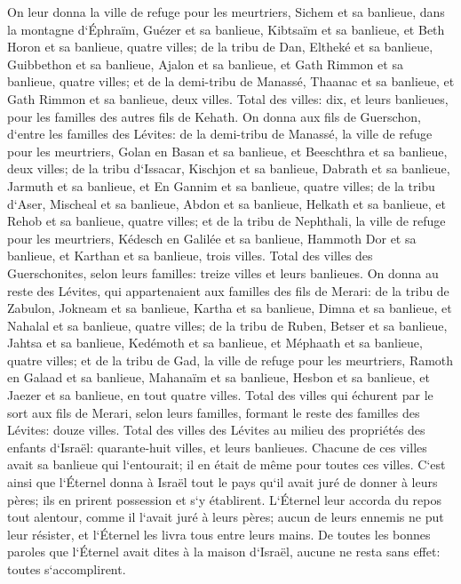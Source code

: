\verse On leur donna la ville de refuge pour les meurtriers, Sichem et sa banlieue, dans la montagne d`Éphraïm, Guézer et sa banlieue, 
\verse Kibtsaïm et sa banlieue, et Beth Horon et sa banlieue, quatre villes; 
\verse de la tribu de Dan, Eltheké et sa banlieue, Guibbethon et sa banlieue, 
\verse Ajalon et sa banlieue, et Gath Rimmon et sa banlieue, quatre villes; 
\verse et de la demi-tribu de Manassé, Thaanac et sa banlieue, et Gath Rimmon et sa banlieue, deux villes. 
\verse Total des villes: dix, et leurs banlieues, pour les familles des autres fils de Kehath. 
\verse On donna aux fils de Guerschon, d`entre les familles des Lévites: de la demi-tribu de Manassé, la ville de refuge pour les meurtriers, Golan en Basan et sa banlieue, et Beeschthra et sa banlieue, deux villes; 
\verse de la tribu d`Issacar, Kischjon et sa banlieue, Dabrath et sa banlieue, 
\verse Jarmuth et sa banlieue, et En Gannim et sa banlieue, quatre villes; 
\verse de la tribu d`Aser, Mischeal et sa banlieue, Abdon et sa banlieue, 
\verse Helkath et sa banlieue, et Rehob et sa banlieue, quatre villes; 
\verse et de la tribu de Nephthali, la ville de refuge pour les meurtriers, Kédesch en Galilée et sa banlieue, Hammoth Dor et sa banlieue, et Karthan et sa banlieue, trois villes. 
\verse Total des villes des Guerschonites, selon leurs familles: treize villes et leurs banlieues. 
\verse On donna au reste des Lévites, qui appartenaient aux familles des fils de Merari: de la tribu de Zabulon, Jokneam et sa banlieue, Kartha et sa banlieue, 
\verse Dimna et sa banlieue, et Nahalal et sa banlieue, quatre villes; 
\verse de la tribu de Ruben, Betser et sa banlieue, Jahtsa et sa banlieue, 
\verse Kedémoth et sa banlieue, et Méphaath et sa banlieue, quatre villes; 
\verse et de la tribu de Gad, la ville de refuge pour les meurtriers, Ramoth en Galaad et sa banlieue, Mahanaïm et sa banlieue, 
\verse Hesbon et sa banlieue, et Jaezer et sa banlieue, en tout quatre villes. 
\verse Total des villes qui échurent par le sort aux fils de Merari, selon leurs familles, formant le reste des familles des Lévites: douze villes. 
\verse Total des villes des Lévites au milieu des propriétés des enfants d`Israël: quarante-huit villes, et leurs banlieues. 
\verse Chacune de ces villes avait sa banlieue qui l`entourait; il en était de même pour toutes ces villes. 
\verse C`est ainsi que l`Éternel donna à Israël tout le pays qu`il avait juré de donner à leurs pères; ils en prirent possession et s`y établirent. 
\verse L`Éternel leur accorda du repos tout alentour, comme il l`avait juré à leurs pères; aucun de leurs ennemis ne put leur résister, et l`Éternel les livra tous entre leurs mains. 
\verse De toutes les bonnes paroles que l`Éternel avait dites à la maison d`Israël, aucune ne resta sans effet: toutes s`accomplirent. 

